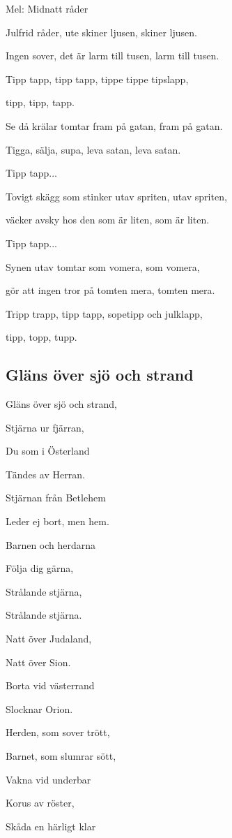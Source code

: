 Mel: Midnatt råder\bigskip

Julfrid råder, ute skiner ljusen, skiner ljusen.

Ingen sover, det är larm till tusen, larm till tusen.

Tipp tapp, tipp tapp, tippe tippe tipslapp,

tipp, tipp, tapp.\bigskip

Se då krälar tomtar fram på gatan, fram på gatan.

Tigga, sälja, supa, leva satan, leva satan.

Tipp tapp...\bigskip

Tovigt skägg som stinker utav spriten, utav spriten,

väcker avsky hos den som är liten, som är liten.

Tipp tapp...\bigskip

Synen utav tomtar som vomera, som vomera,

gör att ingen tror på tomten mera, tomten mera.

Tripp trapp, tipp tapp, sopetipp och julklapp,

tipp, topp, tupp.\bigskip

\subsection{\textbf{Gläns över sjö och strand}}

Gläns över sjö och strand,

Stjärna ur fjärran,

Du som i Österland

Tändes av Herran.

Stjärnan från Betlehem

Leder ej bort, men hem.

Barnen och herdarna

Följa dig gärna,

Strålande stjärna,

Strålande stjärna. \bigskip

Natt över Judaland,

Natt över Sion.

Borta vid västerrand

Slocknar Orion.

Herden, som sover trött,

Barnet, som slumrar sött,

Vakna vid underbar

Korus av röster,

Skåda en härligt klar

